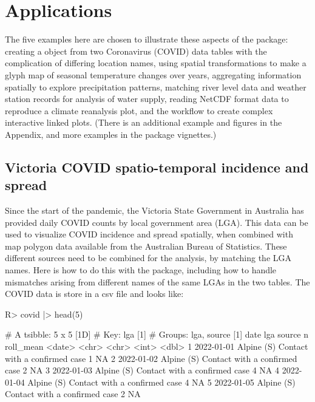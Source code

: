 \documentclass[
  shortnames]{jss}
\begin{document}
\hypertarget{examples}{%
\section{Applications}\label{examples}}

The five examples here are chosen to illustrate these aspects of the  package: creating a  object from two Coronavirus (COVID) data tables with the complication of differing location names, using spatial transformations to make a glyph map of seasonal temperature changes over years, aggregating information spatially to explore precipitation patterns, matching river level data and weather station records for analysis of water supply, reading NetCDF format data to reproduce a climate reanalysis plot, and the workflow to create complex interactive linked plots. (There is an additional example and figures in the Appendix, and more examples in the package vignettes.)

\hypertarget{covid}{%
\subsection{Victoria COVID spatio-temporal incidence and spread}\label{covid}}

Since the start of the pandemic, the Victoria State Government in Australia has provided daily COVID counts by local government area (LGA). This data can be used to visualize COVID incidence and spread spatially, when combined with map polygon data available from the Australian Bureau of Statistics. These different sources need to be combined for the analysis, by matching the LGA names. Here is how to do this with the  package, including how to handle mismatches arising from different names of the same LGAs in the two tables. The COVID data is store in a csv file and looks like:

\begin{CodeChunk}
\begin{CodeInput}
R> covid |> head(5)
\end{CodeInput}
\begin{CodeOutput}
# A tsibble: 5 x 5 [1D]
# Key:       lga [1]
# Groups:    lga, source [1]
  date       lga        source                            n roll_mean
  <date>     <chr>      <chr>                         <int>     <dbl>
1 2022-01-01 Alpine (S) Contact with a confirmed case     1        NA
2 2022-01-02 Alpine (S) Contact with a confirmed case     2        NA
3 2022-01-03 Alpine (S) Contact with a confirmed case     4        NA
4 2022-01-04 Alpine (S) Contact with a confirmed case     4        NA
5 2022-01-05 Alpine (S) Contact with a confirmed case     2        NA
\end{CodeOutput}
\end{CodeChunk}
\end{document}
